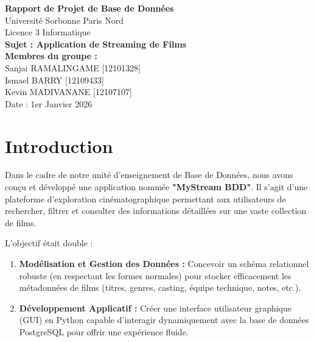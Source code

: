 \documentclass[12pt]{article}
\begin{document}
\begin{titlepage}
    \centering
    \vspace*{4cm}
    
    {\huge \textbf{Rapport de Projet de Base de Données}} \\[1cm]
    
    {\Large Université Sorbonne Paris Nord} \\[0.5cm]
    {\large Licence 3 Informatique} \\[2cm]

    \textbf{\Large Sujet : Application de Streaming de Films} \\[2cm]

    \textbf{Membres du groupe :} \\[0.5cm]
    {\large Sanjai RAMALINGAME [12101328]} \\
    {\large Ismael BARRY [12109433]} \\
    {\large Kevin MADIVANANE [12107107]} \\[2cm]

    {\large Date : 1er Janvier 2026}
    
    \vfill
\end{titlepage}

\newpage
\tableofcontents
\newpage

\section{Introduction}

Dans le cadre de notre unité d'enseignement de Base de Données, nous avons conçu et développé une application nommée \textbf{"MyStream BDD"}. Il s'agit d'une plateforme d'exploration cinématographique permettant aux utilisateurs de rechercher, filtrer et consulter des informations détaillées sur une vaste collection de films.

L'objectif était double :
\begin{enumerate}
    \item \textbf{Modélisation et Gestion des Données :} Concevoir un schéma relationnel robuste (en respectant les formes normales) pour stocker efficacement les métadonnées de films (titres, genres, casting, équipe technique, notes, etc.).
    \item \textbf{Développement Applicatif :} Créer une interface utilisateur graphique (GUI) en Python capable d'interagir dynamiquement avec la base de données PostgreSQL pour offrir une expérience fluide.
\end{enumerate}
\end{document}
